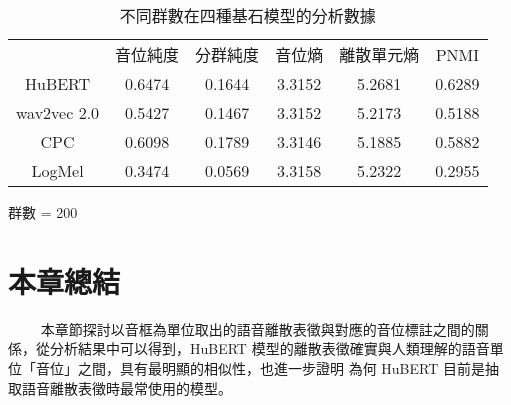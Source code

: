 \begin{table}[!htbp]
    \begin{subtable}[t]{\textwidth}
        \centering
        \begin{tabular}{cccccc}
            & 音位純度 & 分群純度 & 音位熵 & 離散單元熵 & PNMI \\
            HuBERT      &   0.6474   &  0.1644 &   3.3152  &  5.2681    &     0.6289   \\   %
            wav2vec 2.0 &   0.5427   &  0.1467 &   3.3152  &  5.2173    &     0.5188   \\   %
            CPC         &   0.6098   &  0.1789 &   3.3146  &  5.1885    &     0.5882   \\   %
            LogMel      &   0.3474   &  0.0569 &   3.3158  &  5.2322    &     0.2955   \\   %
        \end{tabular}
        \caption{群數 = 200}
        \label{tab:ch3-clu200}
    \end{subtable}

    \caption{不同群數在四種基石模型的分析數據}
    \label{tab:grouped_tables}
\end{table}
 

\section{本章總結}

　　
本章節探討以音框為單位取出的語音離散表徵與對應的音位標註之間的關係，從分析結果中可以得到，HuBERT 模型的離散表徵確實與人類理解的語音單位「音位」之間，具有最明顯的相似性，也進一步證明
為何 HuBERT 目前是抽取語音離散表徵時最常使用的模型。
















